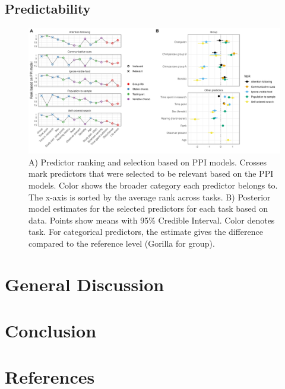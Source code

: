 \documentclass[
  man,floatsintext]{apa6}
\begin{document}
\hypertarget{predictability}{%
\subsection{Predictability}\label{predictability}}

\begin{figure}

{\centering \includegraphics[width=1\linewidth]{../visuals/pred_sum} 

}

\caption{A) Predictor ranking and selection based on PPI models. Crosses mark predictors that were selected to be relevant based on the PPI models. Color shows the broader category each predictor belongs to. The x-axis is sorted by the average rank across tasks. B) Posterior model estimates for the selected predictors for each task based on data. Points show means with 95\% Credible Interval. Color denotes task. For categorical predictors, the estimate gives the difference compared to the reference level (Gorilla for group).}\label{fig:figpred}
\end{figure}

\hypertarget{general-discussion}{%
\section{General Discussion}\label{general-discussion}}

\hypertarget{conclusion}{%
\section{Conclusion}\label{conclusion}}

\newpage

\hypertarget{references}{%
\section{References}\label{references}}
\end{document}
